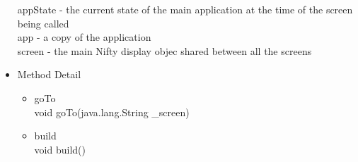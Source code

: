 \documentclass[letterpaper]{article}
\begin{document}
\begin{itemize}
								appState - the current state of the main application at the time of the screen being called \\
								app - a copy of the application \\
								screen - the main Nifty display objec shared between all the screens \\
						\item	Method Detail
								\begin{itemize}
									\item	goTo \\
											void goTo(java.lang.String \_screen)
									\item	build \\
											void build()
								\end{itemize}
					\end{itemize}
					
\end{document}
